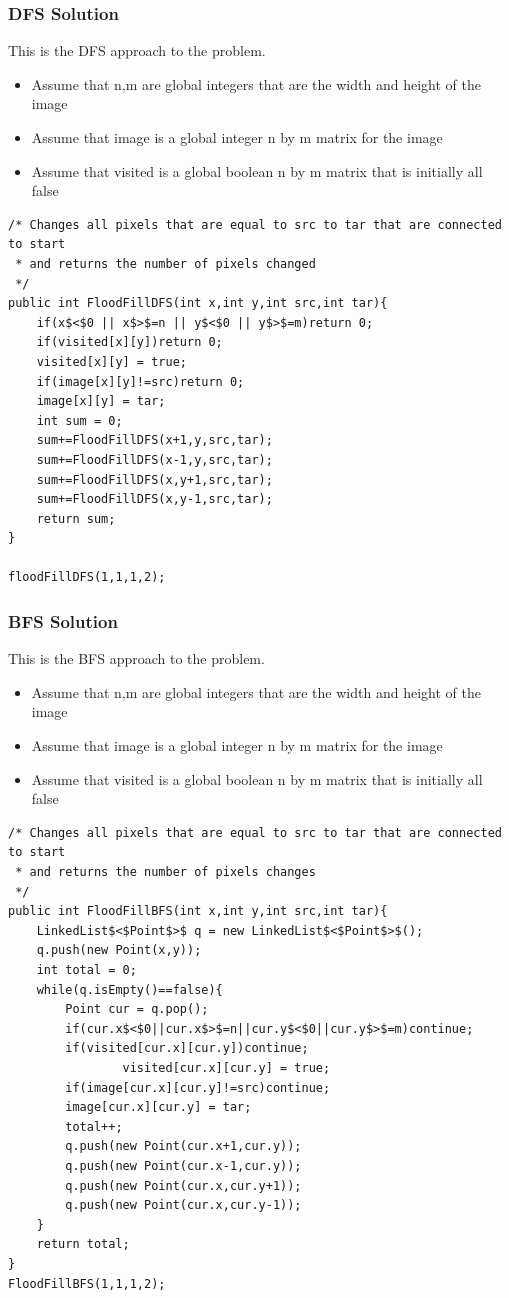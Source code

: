 \documentclass[11pt,oneside]{book}
\begin{document}
\subsubsection{DFS Solution}

This is the DFS approach to the problem.

\begin{itemize}
\item Assume that n,m are global integers that are the width and height of the image
\item Assume that image is a global integer n by m matrix for the image
\item Assume that visited is a global boolean n by m matrix that is initially all false
\end{itemize}

\begin{lstlisting}
/* Changes all pixels that are equal to src to tar that are connected to start
 * and returns the number of pixels changed
 */
public int FloodFillDFS(int x,int y,int src,int tar){
    if(x$<$0 || x$>$=n || y$<$0 || y$>$=m)return 0;
    if(visited[x][y])return 0;
    visited[x][y] = true;
    if(image[x][y]!=src)return 0;
    image[x][y] = tar;
    int sum = 0;
    sum+=FloodFillDFS(x+1,y,src,tar);
    sum+=FloodFillDFS(x-1,y,src,tar);
    sum+=FloodFillDFS(x,y+1,src,tar);
    sum+=FloodFillDFS(x,y-1,src,tar);
    return sum;
}

floodFillDFS(1,1,1,2);
\end{lstlisting}

\subsubsection{BFS Solution}

This is the BFS approach to the problem.

\begin{itemize}
\item Assume that n,m are global integers that are the width and height of the image
\item Assume that image is a global integer n by m matrix for the image
\item Assume that visited is a global boolean n by m matrix that is initially all false
\end{itemize}

\begin{lstlisting}
/* Changes all pixels that are equal to src to tar that are connected to start
 * and returns the number of pixels changes 
 */
public int FloodFillBFS(int x,int y,int src,int tar){
    LinkedList$<$Point$>$ q = new LinkedList$<$Point$>$();
    q.push(new Point(x,y));
    int total = 0;
    while(q.isEmpty()==false){
        Point cur = q.pop();
        if(cur.x$<$0||cur.x$>$=n||cur.y$<$0||cur.y$>$=m)continue;
        if(visited[cur.x][cur.y])continue;
                visited[cur.x][cur.y] = true;
        if(image[cur.x][cur.y]!=src)continue;
        image[cur.x][cur.y] = tar;
        total++;
        q.push(new Point(cur.x+1,cur.y));
        q.push(new Point(cur.x-1,cur.y));
        q.push(new Point(cur.x,cur.y+1));
        q.push(new Point(cur.x,cur.y-1));
    }
    return total;
}
FloodFillBFS(1,1,1,2);
\end{lstlisting}
\end{document}
